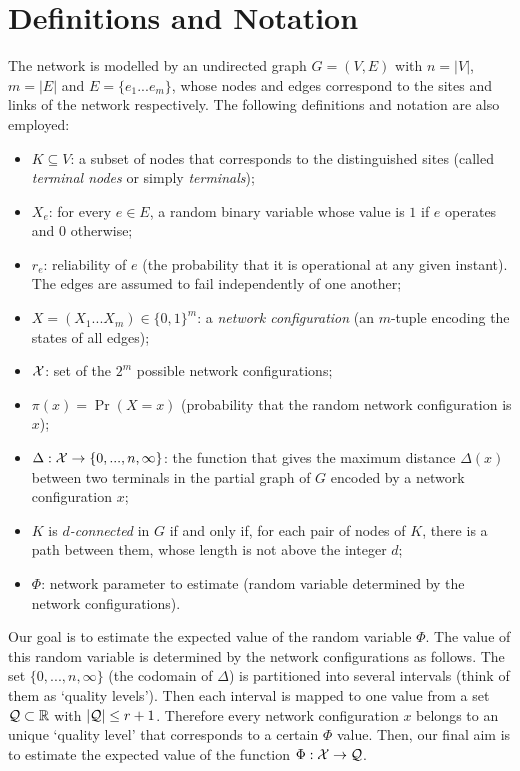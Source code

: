 \documentclass[a4paper]{article}
\begin{document}
\section{Definitions and Notation}\label{s:defin}

The network is modelled by an undirected graph $G=(V,E)$ with $n=|V|$, $m=|E|$ and $E=\{e_1...e_m\}$, whose nodes and edges correspond to the sites and links of the network respectively. The following definitions and notation are also employed:

\begin{itemize}
\item $K\subseteq V$: a subset of nodes that corresponds to the distinguished sites (called \emph{terminal nodes} or simply \emph{terminals});
\item $X_e$: for every $e{\in}E$, a random binary variable whose value is $1$ if $e$ operates and $0$ otherwise;
\item $r_e$: reliability of $e$ (the probability that it is operational at any given instant). The edges are assumed to fail independently of one another;
\item $X=(X_1...X_m)\in\{0,1\}^m$: a \emph{network configuration} (an $m$-tuple encoding the states of all edges);
\item $\cal X$: set of the $2^m$ possible network configurations;
\item $\pi(x) = \Pr(X=x)$ (probability that the random network configuration is $x$);
\item $\Delta:{\cal X}\rightarrow \{0,...,n,\infty\}$: the function that gives the maximum distance $\Delta(x)$ between two terminals in the partial graph of $G$ encoded by a network configuration $x$;
\item $K$ is \emph{$d$-connected} in $G$ if and only if, for each pair of nodes of $K$, there is a path between them, whose length is not above the integer $d$;
\item $\Phi$: network parameter to estimate (random variable determined by the network configurations).
\end{itemize}

Our goal is to estimate the expected value of the random variable $\Phi$. The value of this random variable is determined by the network configurations as follows. The set $\{0,...,n,\infty\}$ (the codomain of $\Delta$) is partitioned into several intervals (think of them as `quality levels'). Then each interval is mapped to one value from a set ${\cal Q}\subset {\mathbb R}$ with $|{\cal Q}|\leq r+1$. Therefore every network configuration $x$ belongs to an unique `quality level' that corresponds to a certain $\Phi$ value. Then, our final aim is to estimate the expected value of the function $\Phi: {\cal X}\to {\cal Q}$.
\end{document}
